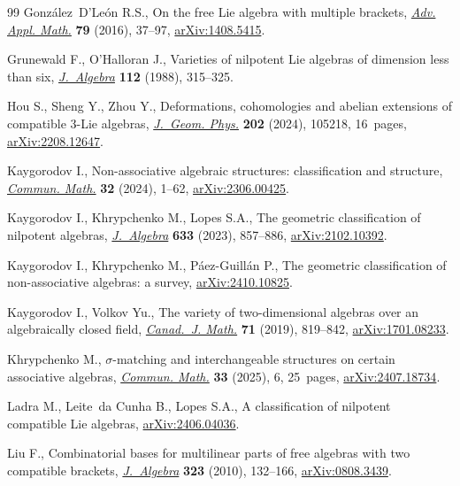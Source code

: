 \begin{thebibliography}{99}
Gonz\'alez~D'Le\'on R.S., On the free {L}ie algebra with multiple brackets,
 \href{https://doi.org/10.1016/j.aam.2016.02.008}{\textit{Adv. Appl. Math.}} \textbf{79} (2016), 37--97, \href{https://arxiv.org/abs/1408.5415}{arXiv:1408.5415}.

Grunewald F., O'Halloran J., Varieties of nilpotent {L}ie algebras of dimension
 less than six, \href{https://doi.org/10.1016/0021-8693(88)90093-2}{\textit{J.~Algebra}} \textbf{112} (1988), 315--325.

Hou S., Sheng Y., Zhou Y., Deformations, cohomologies and abelian extensions of
 compatible 3-{L}ie algebras, \href{https://doi.org/10.1016/j.geomphys.2024.105218}{\textit{J.~Geom. Phys.}} \textbf{202} (2024),
 105218, 16~pages, \href{https://arxiv.org/abs/2208.12647}{arXiv:2208.12647}.

Kaygorodov I., Non-associative algebraic structures: classification and
 structure, \href{https://doi.org/10.46298/cm.11419}{\textit{Commun. Math.}} \textbf{32} (2024), 1--62,
 \href{https://arxiv.org/abs/2306.00425}{arXiv:2306.00425}.

Kaygorodov I., Khrypchenko M., Lopes S.A., The geometric classification of
 nilpotent algebras, \href{https://doi.org/10.1016/j.jalgebra.2023.04.028}{\textit{J.~Algebra}} \textbf{633} (2023), 857--886,
 \href{https://arxiv.org/abs/2102.10392}{arXiv:2102.10392}.

Kaygorodov I., Khrypchenko M., P\'aez-Guill\'an P., The geometric
 classification of non-associative algebras: a survey, \href{https://arxiv.org/abs/2410.10825}{arXiv:2410.10825}.

Kaygorodov I., Volkov Yu., The variety of two-dimensional algebras over an
 algebraically closed field, \href{https://doi.org/10.4153/s0008414x18000056}{\textit{Canad.~J. Math.}} \textbf{71} (2019),
 819--842, \href{https://arxiv.org/abs/1701.08233}{arXiv:1701.08233}.

Khrypchenko M., $\sigma$-matching and interchangeable structures on certain
 associative algebras,
\href{https://doi.org/10.46298/cm.13990}{\textit{Commun. Math.}} \textbf{33} (2025), 6, 25~pages,
 \href{https://arxiv.org/abs/2407.18734}{arXiv:2407.18734}.

Ladra M., Leite~da Cunha B., Lopes S.A., A classification of nilpotent
 compatible Lie algebras, \href{https://arxiv.org/abs/2406.04036}{arXiv:2406.04036}.

Liu F., Combinatorial bases for multilinear parts of free algebras with two
 compatible brackets, \href{https://doi.org/10.1016/j.jalgebra.2009.10.002}{\textit{J.~Algebra}} \textbf{323} (2010), 132--166,
 \href{https://arxiv.org/abs/0808.3439}{arXiv:0808.3439}.


\end{thebibliography}
